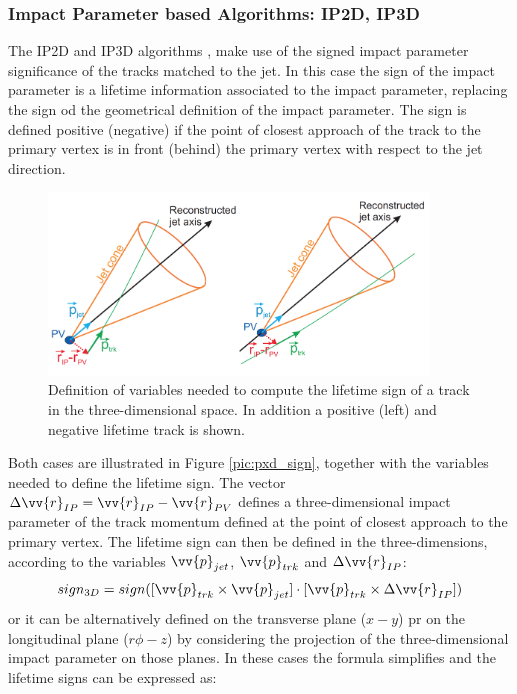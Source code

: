 \subsubsection{Impact Parameter based Algorithms: IP2D, IP3D}
The IP2D and IP3D algorithms \cite{BTAG_15}, make use of the signed impact parameter significance of the tracks matched to the jet.
In this case the sign of the impact parameter is a lifetime information associated to the impact parameter, replacing the sign od the geometrical definition of the impact parameter. The sign is defined positive (negative) if the point of closest approach of the track to the primary vertex is in front (behind) the primary vertex with respect to the jet direction.
\begin{figure}
\centering
\includegraphics[width=0.9\textwidth]{Images/b-tagging/ipxd_sign.png}
\caption{Definition of variables needed to compute the lifetime sign of a track in the three-dimensional space. In addition a positive (left) and negative lifetime track is shown.}
\label{pic:ipxd_sign}
\end{figure}
Both cases are illustrated in Figure \ref{pic:pxd_sign}, together with the variables needed to define the lifetime sign.
The vector $\Delta\vv{r}_{IP} = \vv{r}_{IP} - \vv{r}_{PV}$ defines a three-dimensional impact parameter of the track momentum defined at the point of closest approach to the primary vertex.
The lifetime sign can then be defined in the three-dimensions, according to the variables $\vv{p}_{jet}$, $\vv{p}_{trk}$ and $\Delta\vv{r}_{IP}$:
\begin{equation}
sign_{3D} = sign([\vv{p}_{trk} \times \vv{p}_{jet}] \cdot [\vv{p}_{trk} \times \Delta\vv{r}_{IP}])
\end{equation}
or it can be alternatively defined on the transverse plane ($x-y$) pr on the longitudinal plane ($r\phi-z$) by considering the projection of the three-dimensional impact parameter on those planes. In these cases the formula simplifies and the lifetime signs can be expressed as:

